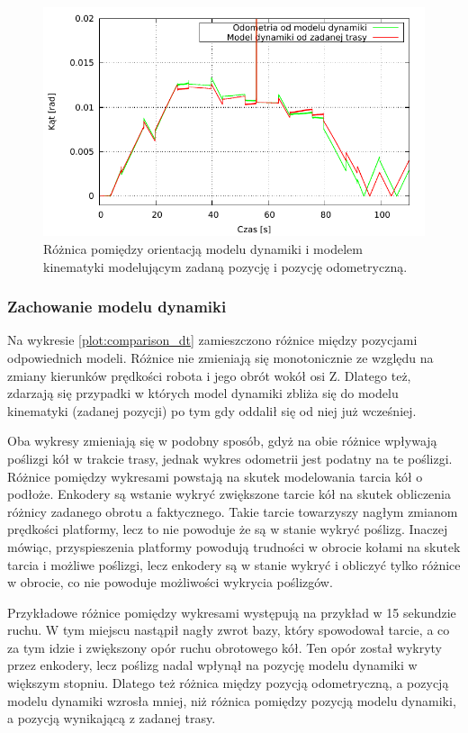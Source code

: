 			\begin{figure}[h]
				\centering
				\includegraphics[width=\textwidth]{plots/comparison_at.pdf}
					\caption{Różnica pomiędzy orientacją modelu dynamiki i modelem kinematyki modelującym zadaną pozycję i pozycję odometryczną.}
				\label{plot:comparison_at}
			\end{figure}
			
		\subsubsection{Zachowanie modelu dynamiki}
			Na wykresie \ref{plot:comparison_dt} zamieszczono różnice między pozycjami odpowiednich modeli.
			Różnice nie zmieniają się monotonicznie ze względu na zmiany kierunków prędkości robota i jego obrót wokół osi Z.
			Dlatego też, zdarzają się przypadki w których model dynamiki zbliża się do modelu kinematyki (zadanej pozycji) po tym gdy oddalił się od niej już wcześniej.
			
			Oba wykresy zmieniają się w podobny sposób, gdyż na obie różnice wpływają poślizgi kół w trakcie trasy, jednak wykres odometrii jest podatny na te poślizgi.
			Różnice pomiędzy wykresami powstają na skutek modelowania tarcia kół o podłoże. 
			Enkodery są wstanie wykryć zwiększone tarcie kół na skutek obliczenia różnicy zadanego obrotu a faktycznego.
			Takie tarcie towarzyszy nagłym zmianom prędkości platformy, lecz to nie powoduje że są w stanie wykryć poślizg.
			Inaczej mówiąc, przyspieszenia platformy powodują trudności w obrocie kołami na skutek tarcia i możliwe poślizgi, lecz enkodery są w stanie wykryć i obliczyć tylko różnice w obrocie, co nie powoduje możliwości wykrycia poślizgów.
			
			Przykładowe różnice pomiędzy wykresami występują na przykład w 15 sekundzie ruchu. 
			W tym miejscu nastąpił nagły zwrot bazy, który spowodował tarcie, a co za tym idzie i zwiększony opór ruchu obrotowego kół.
			Ten opór został wykryty przez enkodery, lecz poślizg nadal wpłynął na pozycję modelu dynamiki w większym stopniu.
			Dlatego też różnica między pozycją odometryczną, a pozycją modelu dynamiki wzrosła mniej, niż różnica pomiędzy pozycją modelu dynamiki, a pozycją wynikającą z zadanej trasy.
			

